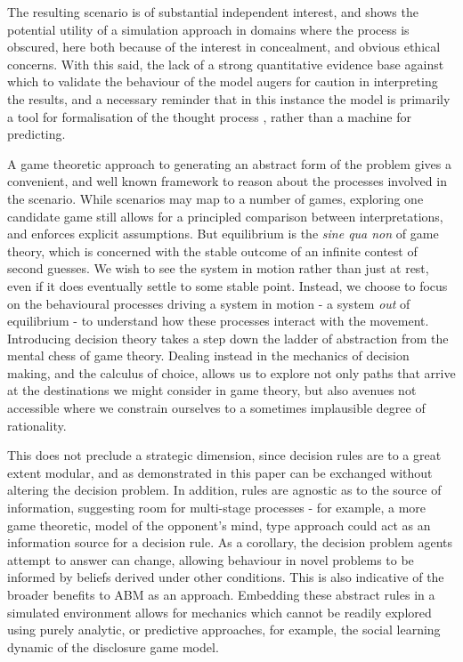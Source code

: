 The resulting scenario is of substantial independent interest, and shows the potential utility of a simulation approach in domains where the process is obscured, here both because of the interest in concealment, and obvious ethical concerns. With this said, the lack of a strong quantitative evidence base against which to validate the behaviour of the model augers for caution in interpreting the results, and a necessary reminder that in this instance the model is primarily a tool for formalisation of the thought process \citep{Epstein2008}, rather than a machine for predicting.


A game theoretic approach to generating an abstract form of the problem gives a convenient, and well known framework to reason about the processes involved in the scenario. While scenarios may map to a number of games, exploring one candidate game still allows for a principled comparison between interpretations, and enforces explicit assumptions. But equilibrium is the \emph{sine qua non} of game theory, which is concerned with the stable outcome of an infinite contest of second guesses.
We wish to see the system in motion rather than just at rest, even if it does eventually settle to some stable point. Instead, we choose to focus on the behavioural processes driving a system in motion - a system \textit{out} of equilibrium - to understand how these processes interact with the movement.
Introducing decision theory takes a step down the ladder of abstraction from the mental chess of game theory. Dealing instead in the mechanics of decision making, and the calculus of choice, allows us to explore not only paths that arrive at the destinations we might consider in game theory, but also avenues not accessible where we constrain ourselves to a sometimes implausible degree of rationality.

This does not preclude a strategic dimension, since decision rules are to a great extent modular, and as demonstrated in this paper can be exchanged without altering the decision problem. In addition, rules are agnostic as to the source of information, suggesting room for multi-stage processes - for example, a more game theoretic, model of the opponent's mind, type approach could act as an information source for a decision rule.  As a corollary, the decision problem agents attempt to answer can change, allowing behaviour in novel problems to be informed by beliefs derived under other conditions. This is also indicative of the broader benefits to \ac{ABM} as an approach. Embedding these abstract rules in a simulated environment allows for mechanics which cannot be readily explored using purely analytic, or predictive approaches, for example, the social learning dynamic of the disclosure game model.

